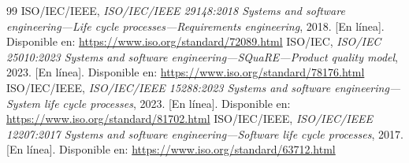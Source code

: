 \documentclass[11pt,a4paper]{article}
\begin{document}
\begin{thebibliography}{99}
 ISO/IEC/IEEE, \emph{ISO/IEC/IEEE 29148:2018 Systems and software engineering---Life cycle processes---Requirements engineering}, 2018. [En línea]. Disponible en: \url{https://www.iso.org/standard/72089.html}
 ISO/IEC, \emph{ISO/IEC 25010:2023 Systems and software engineering---SQuaRE---Product quality model}, 2023. [En línea]. Disponible en: \url{https://www.iso.org/standard/78176.html}
 ISO/IEC/IEEE, \emph{ISO/IEC/IEEE 15288:2023 Systems and software engineering---System life cycle processes}, 2023. [En línea]. Disponible en: \url{https://www.iso.org/standard/81702.html}
 ISO/IEC/IEEE, \emph{ISO/IEC/IEEE 12207:2017 Systems and software engineering---Software life cycle processes}, 2017. [En línea]. Disponible en: \url{https://www.iso.org/standard/63712.html}


\end{thebibliography}
\end{document}
